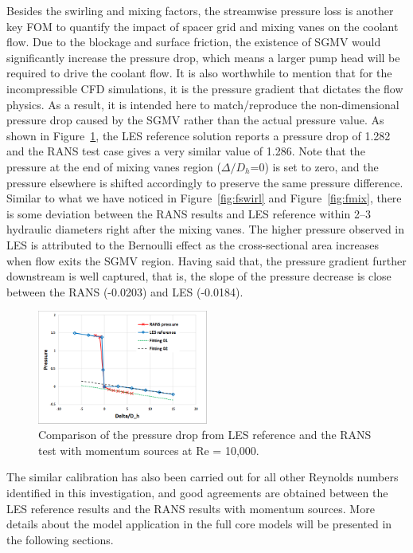 Besides the swirling and mixing factors, the streamwise pressure loss is another key FOM to quantify the impact of spacer grid and mixing vanes on the coolant flow. Due to the blockage and surface friction, the existence of SGMV would significantly increase the pressure drop, which means a larger pump head will be required to drive the coolant flow. It is also worthwhile to mention that for the incompressible CFD simulations, it is the pressure gradient that dictates the flow physics. As a result, it is intended here to match/reproduce the non-dimensional pressure drop caused by the SGMV rather than the actual pressure value. As shown in Figure~\ref{fig:presloss}, the LES reference solution reports a pressure drop of 1.282 and the RANS test case gives a very similar value of 1.286. Note that the pressure at the end of mixing vanes region ($\Delta/D_h$=0) is set to zero, and the pressure elsewhere is shifted accordingly to preserve the same pressure difference. Similar to what we have noticed in Figure~\ref{fig:fswirl} and Figure~\ref{fig:fmix}, there is some deviation between the RANS results and LES reference within 2--3 hydraulic diameters right after the mixing vanes. The higher pressure observed in LES is attributed to the Bernoulli effect as the cross-sectional area increases when flow exits the SGMV region.  Having said that, the pressure gradient further downstream is well captured, that is, the slope of the pressure decrease is close between the RANS (-0.0203) and LES (-0.0184).

\begin{figure}[!ht]
\centering
\includegraphics[width=0.5\textwidth]{./figures/Results_pressure_loss.png}
\caption{Comparison of the pressure drop from LES reference and the RANS test with momentum sources at Re = 10,000. }
\label{fig:presloss}
\end{figure}

The similar calibration has also been carried out for all other Reynolds numbers identified in this investigation, and good agreements are obtained between the LES reference results and the RANS results with momentum sources. More details about the model application in the full core models will be presented in the following sections.
